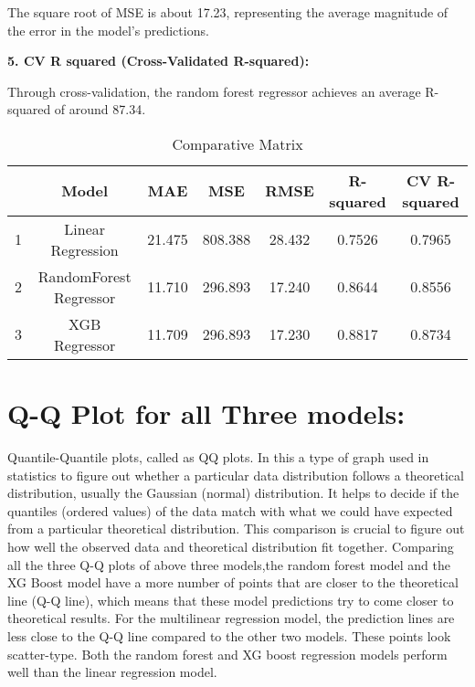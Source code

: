 \documentclass[12pt, a4paper,oneside]{book}
\numberwithin{equation}{section}
\begin{document}
The square root of MSE is about 17.23, representing the average magnitude of the error in the model's predictions.

\textbf{5. CV R squared (Cross-Validated R-squared):} 

Through cross-validation, the random forest regressor achieves an average R-squared of around 87.34.

\begin{table}[H]
\centering
\small
\renewcommand{\arraystretch}{0.8}
\bigskip
\begin{tabular}{|p{1cm}|c|c|c|c|c|c|}
\hline
{\textbf{ }} & {\textbf{Model }} & {\textbf{MAE }} & {\textbf{MSE }} & {\textbf{RMSE }} & {\textbf{R-squared }} & {\textbf{CV R-squared }} \\
\hline
1 & Linear Regression & 21.475 & 808.388 & 28.432 & 0.7526 & 0.7965 \\ 
\hline
2 & RandomForest Regressor & 11.710 & 296.893 & 17.240 & 0.8644 & 0.8556 \\
\hline
3 & XGB Regressor & 11.709 & 296.893 & 17.230 & 0.8817 & 0.8734 \\ 
\hline
\end{tabular}
\caption{Comparative Matrix}
\end{table}

\section{Q-Q Plot for all Three models:}


Quantile-Quantile plots, called as QQ plots. In this a type of graph used in statistics to figure out whether a particular data distribution follows a theoretical distribution, usually the Gaussian (normal) distribution. It helps to decide if the quantiles (ordered values) of the data match with what we could have expected from a particular theoretical distribution. This comparison is crucial to figure out how well the observed data and theoretical distribution fit together.
Comparing all the three Q-Q plots of above three models,the random forest model and the XG Boost model have a more number of points that are closer to the theoretical line (Q-Q line), which means that these model predictions try to come closer to theoretical results. For the multilinear regression model, the prediction lines are less close to the Q-Q line compared to the other two models. These points look scatter-type.
Both the random forest and XG boost regression models perform well than the linear regression model.
\end{document}

